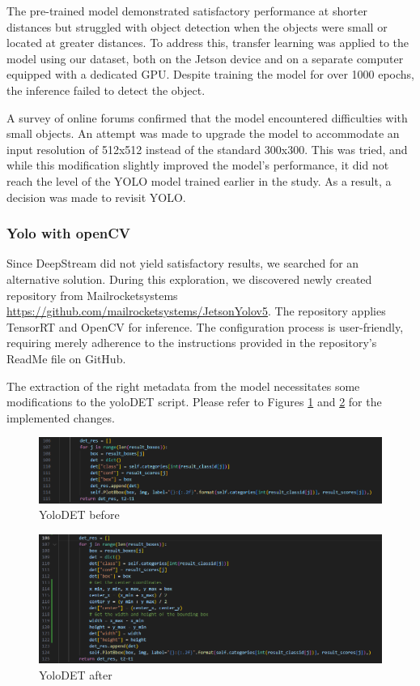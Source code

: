 The pre-trained model demonstrated satisfactory performance at shorter distances but struggled with object detection when the objects were small or located at greater distances. To address this, transfer learning was applied to the model using our dataset, both on the Jetson device and on a separate computer equipped with a dedicated GPU. Despite training the model for over 1000 epochs, the inference failed to detect the object.

A survey of online forums confirmed that the model encountered difficulties with small objects. An attempt was made to upgrade the model to accommodate an input resolution of 512x512 instead of the standard 300x300. This was tried, and while this modification slightly improved the model's performance, it did not reach the level of the YOLO model trained earlier in the study. As a result, a decision was made to revisit YOLO.

\subsubsection{Yolo with openCV}

Since DeepStream did not yield satisfactory results, we searched for an alternative solution. During this exploration, we discovered newly created repository from Mailrocketsystems \url{https://github.com/mailrocketsystems/JetsonYolov5}. The repository applies TensorRT and OpenCV for inference. The configuration process is user-friendly, requiring merely adherence to the instructions provided in the repository's ReadMe file on GitHub.

The extraction of the right metadata from the model necessitates some modifications to the yoloDET script. Please refer to Figures \ref{fig:inference_before} and \ref{fig:inference_after} for the implemented changes.



\begin{figure}[H]
    \centering
    \includegraphics[scale=0.5]{evenbilder/yolo opencv/inference-before.png}
    \caption{YoloDET before}
    \label{fig:inference_before}
\end{figure}

\begin{figure}[H]
    \centering
    \includegraphics[scale=0.5]{evenbilder/yolo opencv/inference-after.png}
    \caption{YoloDET after}
    \label{fig:inference_after}
\end{figure}

